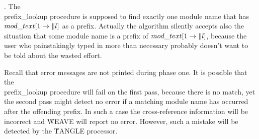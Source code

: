 . The \\{prefix\_lookup} procedure is supposed to find exactly one module
name that has $\\{mod\_text}[1\to\|l]$ as a prefix. Actually the algorithm
silently accepts also the situation that some module name is a prefix of
$\\{mod\_text}[1\to\|l]$, because the user who painstakingly typed in more than
necessary probably doesn't want to be told about the wasted effort.

Recall that error messages are not printed during phase one. It is
possible that the \\{prefix\_lookup} procedure will fail on the first pass,
because there is no match, yet the second pass might detect no error if a
matching module name has occurred after the offending prefix. In such a
case the cross-reference information will be incorrect and \.{WEAVE} will
report no error. However, such a mistake will be detected by the
\.{TANGLE} processor.

